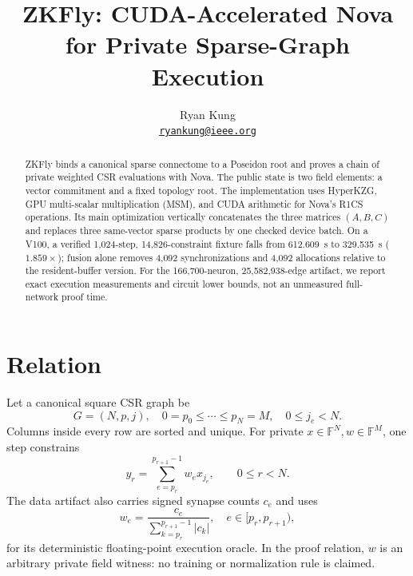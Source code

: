 \documentclass[9pt,twocolumn]{extarticle}
\title{\vspace{-1.2em}\textbf{ZKFly: CUDA-Accelerated Nova for Private Sparse-Graph Execution}\vspace{-0.5em}}
\author{Ryan Kung\\[-0.2em]
\small\href{mailto:ryankung@ieee.org}{\texttt{ryankung@ieee.org}}}
\date{}
\newcommand{\F}{\mathbb{F}}
\begin{document}
\maketitle
\vspace{-1.6em}

\begin{abstract}
ZKFly binds a canonical sparse connectome to a Poseidon root and proves a chain of private weighted CSR evaluations with Nova.  The public state is two field elements: a vector commitment and a fixed topology root.  The implementation uses HyperKZG, GPU multi-scalar multiplication (MSM), and CUDA arithmetic for Nova's R1CS operations.  Its main optimization vertically concatenates the three matrices $(A,B,C)$ and replaces three same-vector sparse products by one checked device batch.  On a V100, a verified 1,024-step, 14,826-constraint fixture falls from \SI{612.609}{s} to \SI{329.535}{s} ($1.859\times$); fusion alone removes 4,092 synchronizations and 4,092 allocations relative to the resident-buffer version.  For the 166,700-neuron, 25,582,938-edge artifact, we report exact execution measurements and circuit lower bounds, not an unmeasured full-network proof time.
\end{abstract}

\section{Relation}

Let a canonical square CSR graph be
\begin{equation}
  G=(N,p,j),\quad 0=p_0\leq\cdots\leq p_N=M,\quad
  0\leq j_e<N.                                            \label{eq:csr}
\end{equation}
Columns inside every row are sorted and unique.  For private
$x\in\F^N,w\in\F^M$, one step constrains
\begin{equation}
  y_r=\sum_{e=p_r}^{p_{r+1}-1} w_e x_{j_e},\qquad 0\leq r<N. \label{eq:forward}
\end{equation}
The data artifact also carries signed synapse counts $c_e$ and uses
\begin{equation}
  w_e=\frac{c_e}{\sum_{k=p_r}^{p_{r+1}-1}|c_k|},
  \quad e\in[p_r,p_{r+1}),                                  \label{eq:weights}
\end{equation}
for its deterministic floating-point execution oracle.  In the proof relation,
$w$ is an arbitrary private field witness: no training or normalization rule is
claimed.
\end{document}
